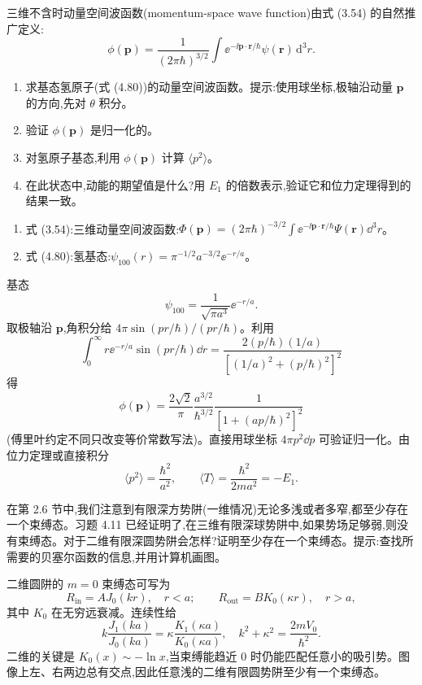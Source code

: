 \begin{question}
三维不含时动量空间波函数(momentum-space wave function)由式 (3.54) 的自然推广定义:
\[
\phi(\mathbf p)=\frac{1}{(2\pi\hbar)^{3/2}}\int \ee^{-\ii\mathbf p\cdot\mathbf r/\hbar}\psi(\mathbf r)\,\mathrm d^3r.
\]
\begin{enumerate}
\item 求基态氢原子(式 (4.80))的动量空间波函数。提示:使用球坐标,极轴沿动量 $\mathbf p$ 的方向,先对 $\theta$ 积分。
\item 验证 $\phi(\mathbf p)$ 是归一化的。
\item 对氢原子基态,利用 $\phi(\mathbf p)$ 计算 $\langle p^2\rangle$。
\item 在此状态中,动能的期望值是什么?用 $E_1$ 的倍数表示,验证它和位力定理得到的结果一致。
\end{enumerate}

\par\smallskip
{}
\begin{enumerate}[leftmargin=2.2em,itemsep=0.12em,topsep=0.12em,parsep=0pt]
\item 式 (3.54):三维动量空间波函数:$\Phi(\mathbf p)=(2\pi\hbar)^{-3/2}\int \ee^{-\ii\mathbf p\cdot\mathbf r/\hbar}\Psi(\mathbf r)\dd^3r$。
\item 式 (4.80):氢基态:$\psi_{100}(r)=\pi^{-1/2}a^{-3/2}\ee^{-r/a}$。
\end{enumerate}

\begin{solution}

基态
\[
\psi_{100}=\frac{1}{\sqrt{\pi a^3}}\ee^{-r/a}.
\]
取极轴沿 $\mathbf p$,角积分给 $4\pi\sin(pr/\hbar)/(pr/\hbar)$。利用
\[
\int_0^\infty r \ee^{-r/a}\sin(pr/\hbar)\dd r=\frac{2(p/\hbar)(1/a)}{[(1/a)^2+(p/\hbar)^2]^2}
\]
得
\[
\phi(\mathbf p)=\frac{2\sqrt2}{\pi}\frac{a^{3/2}}{\hbar^{3/2}}\frac{1}{\left[1+(ap/\hbar)^2\right]^2}
\]
(傅里叶约定不同只改变等价常数写法)。直接用球坐标 $4\pi p^2\dd p$ 可验证归一化。由位力定理或直接积分
\[
\langle p^2\rangle=\frac{\hbar^2}{a^2},
\qquad
\langle T\rangle=\frac{\hbar^2}{2ma^2}=-E_1.
\]

\end{solution}
\end{question}

\begin{question}
在第 2.6 节中,我们注意到有限深方势阱(一维情况)无论多浅或者多窄,都至少存在一个束缚态。习题 4.11 已经证明了,在三维有限深球势阱中,如果势场足够弱,则没有束缚态。对于二维有限深圆势阱会怎样?证明至少存在一个束缚态。提示:查找所需要的贝塞尔函数的信息,并用计算机画图。
\begin{solution}

二维圆阱的 $m=0$ 束缚态可写为
\[
R_{\text{in}}=AJ_0(kr),\quad r<a;
\qquad
R_{\text{out}}=BK_0(\kappa r),\quad r>a,
\]
其中 $K_0$ 在无穷远衰减。连续性给
\[
k\frac{J_1(ka)}{J_0(ka)}=\kappa\frac{K_1(\kappa a)}{K_0(\kappa a)},
\quad k^2+\kappa^2=\frac{2mV_0}{\hbar^2}.
\]
二维的关键是 $K_0(x)\sim-\ln x$,当束缚能趋近 0 时仍能匹配任意小的吸引势。图像上左、右两边总有交点,因此任意浅的二维有限圆势阱至少有一个束缚态。

\end{solution}
\end{question}

